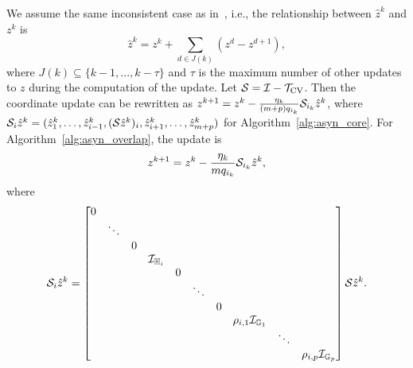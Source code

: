 We assume the same inconsistent case as in~\cite{Peng_2015_AROCK}, i.e., the relationship between $\hat z^k$ and $z^k$ is
\begin{equation}
\hat{z}^k=z^k+\sum_{d\in J(k)}(z^d-z^{d+1}),
\end{equation}
where $J(k)\subseteq \{k-1,...,k-\tau\}$ and $\tau$ is the maximum number of other updates to $z$ during the computation of the update. 
Let ${\mathcal{S}}={\mathcal{I}}-{{\mathcal{T}}_{\textnormal{CV}}}$. %
Then the coordinate update can be rewritten as $z^{k+1}=z^k-\frac{\eta_k}{(m+p)q_{i_k}}{\mathcal{S}}_{i_k}\hat{z}^k$, where ${\mathcal{S}}_{i}\hat{z}^k=(\hat z_1^k,\dots, \hat z_{i-1}^k, ({\mathcal{S}}\hat z^k)_i, \hat z_{i+1}^k,\dots,\hat z_{m+p}^k)$  for Algorithm~\ref{alg:asyn_core}. For Algorithm~\ref{alg:asyn_overlap}, the update is  
\begin{align}\label{eqn:asyn_update_a2}
z^{k+1}=z^k-\frac{\eta_k}{mq_{i_k}}\cS_{i_k}\hat{z}^k,
\end{align} where 
$$\cS_{i}\hat{z}^k=\begin{bmatrix}
0&&&&&&&&&\\
&\ddots&&&&&&&&\\
&&0&&&&&&&\\
&&&\cI_{\HH_i}&&&&&&\\
&&&&0&&&&&\\
&&&&&\ddots&&&&\\
&&&&&&0&&&\\
&&&&&&&\rho_{i,1}\cI_{\GG_1}&&\\
&&&&&&&&\ddots&\\
&&&&&&&&&\rho_{i,p}\cI_{\GG_p}
\end{bmatrix}\cS\hat{z}^k.$$
